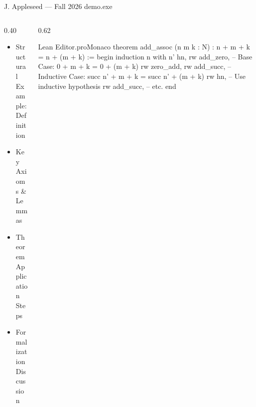 \documentclass{retrobeamer}
\begin{document}
\begin{frame}
\end{frame}

\begin{frame}
    {J. Appleseed --- Fall 2026}
    {\dosfont demo.exe }
\end{frame}

\begin{frame}[fragile,t]
  \begin{columns}[T]
    \begin{column}{0.40\textwidth}
      \begin{itemize}
        \item Structural Example: Definition
        \item Key Axioms \& Lemmas
        \item Theorem Application Steps
        \item Formalization Discussion
      \end{itemize}
    \end{column}
    \begin{column}{0.62\textwidth}
\begin{macwindow}{Lean Editor.pro}{Monaco}
theorem add_assoc (n m k : N) : n + m + k = n + (m + k) :=
begin
  induction n with n' hn,
    rw add_zero,  -- Base Case: 0 + m + k = 0 + (m + k)
    rw zero_add,
    rw add_succ,  -- Inductive Case: succ n' + m + k = succ n' + (m + k)
    rw hn,        -- Use inductive hypothesis
    rw add_succ,  -- etc.
end
\end{macwindow}
    \end{column}
  \end{columns}
\end{frame}
\end{document}
